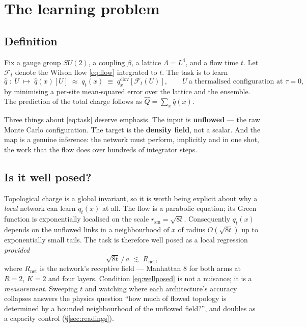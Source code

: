 \documentclass[11pt,a4paper]{article}
\newcommand{\qhat}{\hat{q}}
\newcommand{\Qhat}{\hat{Q}}
\newcommand{\qflow}{q_{t}}
\begin{document}
\section{The learning problem}

\subsection{Definition}

Fix a gauge group $SU(2)$, a coupling $\beta$, a lattice $\Lambda = L^4$, and a
flow time $t$. Let $\mathcal{F}_t$ denote the Wilson flow \eqref{eq:flow}
integrated to $t$. The task is to learn
\begin{equation}
  \qhat \;:\; U \;\longmapsto\; \qhat(x)[U] \;\approx\; \qflow(x)
  \;\equiv\; q^{\mathrm{clov}}_x\!\left[\mathcal{F}_t(U)\right],
  \qquad U \ \text{a thermalised configuration at } \tau = 0,
  \label{eq:task}
\end{equation}
by minimising a per-site mean-squared error over the lattice and the ensemble.
The prediction of the total charge follows as $\Qhat = \sum_{x} \qhat(x)$.

Three things about \eqref{eq:task} deserve emphasis. The input is
\textbf{unflowed} --- the raw Monte Carlo configuration. The target is the
\textbf{density field}, not a scalar. And the map is a genuine inference: the
network must perform, implicitly and in one shot, the work that the flow does
over hundreds of integrator steps.

\subsection{Is it well posed?}

Topological charge is a global invariant, so it is worth being explicit about why
a \emph{local} network can learn $\qflow(x)$ at all. The flow is a parabolic
equation; its Green function is exponentially localised on the scale
$r_{\mathrm{sm}} = \sqrt{8t}$. Consequently $\qflow(x)$ depends on the unflowed
links in a neighbourhood of $x$ of radius $O(\sqrt{8t})$ up to exponentially
small tails. The task is therefore well posed as a local regression \emph{provided}
\begin{equation}
  \sqrt{8t}\,/\,a \;\lesssim\; R_{\mathrm{net}},
  \label{eq:wellposed}
\end{equation}
where $R_{\mathrm{net}}$ is the network's receptive field --- Manhattan $8$ for
both arms at $R = 2$, $K = 2$ and four layers. Condition \eqref{eq:wellposed} is
not a nuisance; it is a \emph{measurement}. Sweeping $t$ and watching where each
architecture's accuracy collapses answers the physics question ``how much of
flowed topology is determined by a bounded neighbourhood of the unflowed
field?'', and doubles as a capacity control (\S\ref{sec:readings}).
\end{document}
